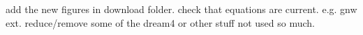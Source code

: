 
add the new figures in download folder.
check that equations are current. e.g. gnw ext.
reduce/remove some of the dream4 or other stuff not used so much.
